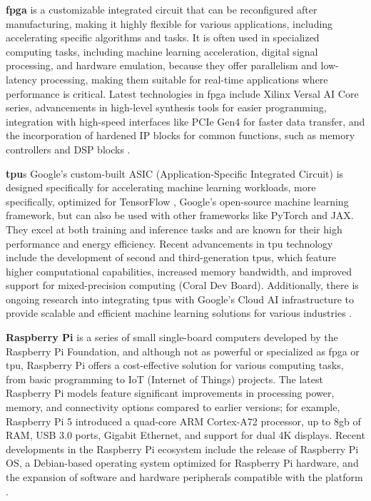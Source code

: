 \textbf{\gls{fpga}} is a customizable integrated circuit that can be reconfigured after manufacturing, making it highly flexible for various applications, including accelerating specific algorithms and tasks. It is often used in specialized computing tasks, including machine learning acceleration, digital signal processing, and hardware emulation, because they offer parallelism and low-latency processing, making them suitable for real-time applications where performance is critical. Latest technologies in \gls{fpga} include Xilinx Versal AI Core series, advancements in high-level synthesis tools for easier programming, integration with high-speed interfaces like PCIe Gen4 for faster data transfer, and the incorporation of hardened IP blocks for common functions, such as memory controllers and DSP blocks \cite{IntelFPGA2024}.

\textbf{\gls{tpu}}s Google's custom-built ASIC (Application-Specific Integrated Circuit) is designed specifically for accelerating machine learning workloads, more specifically, optimized for TensorFlow \cite{TensorFl23}, Google's open-source machine learning framework, but can also be used with other frameworks like PyTorch and JAX. They excel at both training and inference tasks and are known for their high performance and energy efficiency. Recent advancements in \gls{tpu} technology include the development of second and third-generation \gls{tpu}s, which feature higher computational capabilities, increased memory bandwidth, and improved support for mixed-precision computing (Coral Dev Board). Additionally, there is ongoing research into integrating \gls{tpu}s with Google's Cloud AI infrastructure to provide scalable and efficient machine learning solutions for various industries \cite{GoogleTPU2024}.

\textbf{Raspberry Pi} is a series of small single-board computers developed by the Raspberry Pi Foundation, and although not as powerful or specialized as \gls{fpga} or \gls{tpu}, Raspberry Pi offers a cost-effective solution for various computing tasks, from basic programming to IoT (Internet of Things) projects. The latest Raspberry Pi models feature significant improvements in processing power, memory, and connectivity options compared to earlier versions; for example, Raspberry Pi 5 introduced a quad-core ARM Cortex-A72 processor, up to 8\gls{g}\gls{b} of RAM, USB 3.0 ports, Gigabit Ethernet, and support for dual 4K displays.
Recent developments in the Raspberry Pi ecosystem include the release of Raspberry Pi OS, a Debian-based operating system optimized for Raspberry Pi hardware, and the expansion of software and hardware peripherals compatible with the platform \cite{Raspberry2023}.


